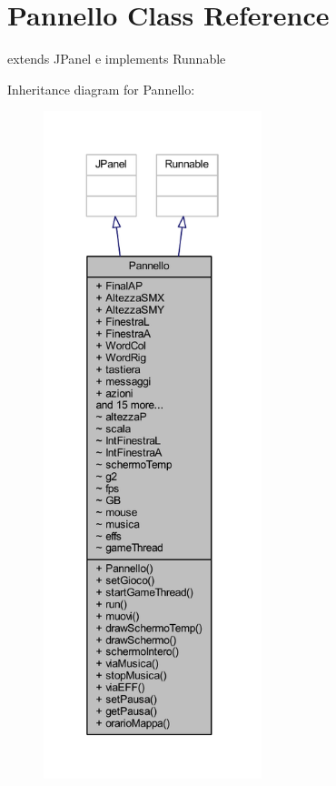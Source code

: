 \hypertarget{classa_1_1survival_1_1game_1_1_pannello}{}\section{Pannello Class Reference}
\label{classa_1_1survival_1_1game_1_1_pannello}


extends J\+Panel e implements Runnable  




Inheritance diagram for Pannello\+:
\nopagebreak
\begin{figure}[H]
\begin{center}
\leavevmode
\includegraphics[height=550pt]{classa_1_1survival_1_1game_1_1_pannello__inherit__graph}
\end{center}
\end{figure}


